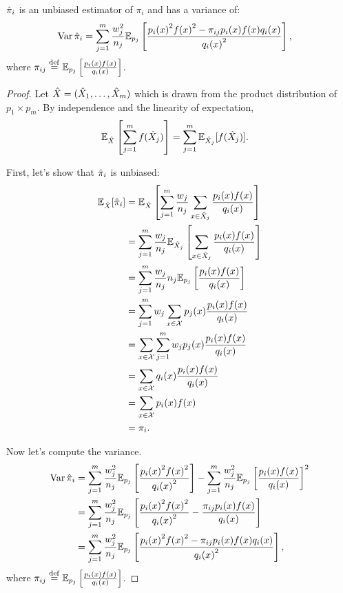 \begin{theorem}
\label{thm:pih}
  ${\hat{\pi}}_i$ is an unbiased estimator of $\pi_i$ and has a variance of:
  \begin{align*}
    \operatorname{Var}{{\hat{\pi}}_i} &= \sum_{j=1}^m \frac{w_j^2}{n_j} \mathbb{E}_{p_j}\left[\frac{{p_i(x)}^2{f(x)}^2 - \pi_{ij}p_i(x)f(x)q_i(x)}{{q_i(x)}^2} \right],
  \end{align*}
  where $\pi_{ij} \stackrel{\rm def}{=} \mathbb{E}_{p_j}\left[\frac{p_i(x)f(x)}{q_i(x)} \right]$.
\end{theorem}
\begin{proof}
  Let ${\hat{X}} = ({\hat{X}}_1, \ldots, {\hat{X}}_m)$ which is drawn from the product distribution of $p_1 \times p_m$.
  By independence and the linearity of expectation, 
  \begin{align*}
    \mathbb{E}_{{\hat{X}}}\left[\sum_{j=1}^m f({\hat{X}}_j) \right] &= \sum_{j=1}^m \mathbb{E}_{{\hat{X}}_j}[f({\hat{X}}_j)].
  \end{align*}

  First, let's show that ${\hat{\pi}}_i$ is unbiased:
  \begin{align*}
    \mathbb{E}_{{\hat{X}}}[{\hat{\pi}}_i] 
    &= \mathbb{E}_{{\hat{X}}}\left[\sum_{j=1}^m \frac{w_j}{n_j} \sum_{x \in {\hat{X}}_j} \frac{p_i(x) f(x)}{q_i(x)} \right] \\
    &= \sum_{j=1}^m \frac{w_j}{n_j} \mathbb{E}_{{\hat{X}}_j}\left[\sum_{x \in {\hat{X}}_j} \frac{p_i(x) f(x)}{q_i(x)} \right] \\
    &= \sum_{j=1}^m \frac{w_j}{n_j} n_j \mathbb{E}_{p_j}\left[\frac{p_i(x) f(x)}{q_i(x)}\right] \\
    &= \sum_{j=1}^m w_j \sum_{x \in \mathcal{X}} p_j(x) \frac{p_i(x) f(x) }{q_i(x)}\\
    &= \sum_{x \in \mathcal{X}} \sum_{j=1}^m w_j p_j(x) \frac{p_i(x) f(x) }{q_i(x)}\\
    &= \sum_{x \in \mathcal{X}} q_i(x) \frac{p_i(x) f(x)}{q_i(x)} \\
    &= \sum_{x \in \mathcal{X}} p_i(x) f(x) \\
    &= \pi_i.
  \end{align*}

  Now let's compute the variance.
  \begin{align*}
    \operatorname{Var}{{\hat{\pi}}_i} 
    &= \sum_{j=1}^m \frac{w_j^2}{n_j} \mathbb{E}_{p_j}\left[\frac{{p_i(x)}^2{f(x)}^2}{{q_i(x)}^2} \right]
    - \sum_{j=1}^m \frac{w_j^2}{n_j} {\mathbb{E}_{p_j}\left[\frac{p_i(x)f(x)}{q_i(x)} \right]}^2 \\
    &= \sum_{j=1}^m \frac{w_j^2}{n_j} \mathbb{E}_{p_j}\left[\frac{{p_i(x)}^2{f(x)}^2}{{q_i(x)}^2} - \frac{\pi_{ij} p_i(x) f(x)}{q_i(x)} \right] \\
    &= \sum_{j=1}^m \frac{w_j^2}{n_j} \mathbb{E}_{p_j}\left[\frac{{p_i(x)}^2{f(x)}^2 - \pi_{ij}p_i(x)f(x)q_i(x)}{{q_i(x)}^2} \right],
  \end{align*}
  where $\pi_{ij} \stackrel{\rm def}{=} \mathbb{E}_{p_j}\left[\frac{p_i(x)f(x)}{q_i(x)} \right]$.
\end{proof}

